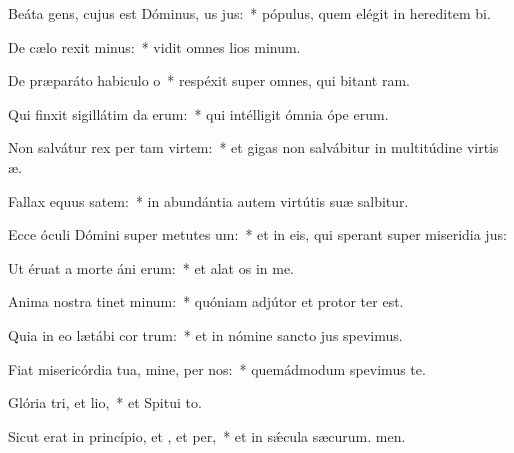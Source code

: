 \item Beáta gens, cujus est Dóminus, us jus:~* pópulus, quem elégit in hereditem bi.
\item De cælo rexit minus:~* vidit omnes lios minum.
\item De præparáto habiculo o~* respéxit super omnes, qui bitant ram.
\item Qui finxit sigillátim da erum:~* qui intélligit ómnia ópe erum.
\item Non salvátur rex per tam virtem:~* et gigas non salvábitur in multitúdine virtis æ.
\item Fallax equus  satem:~* in abundántia autem virtútis suæ  salbitur.
\item Ecce óculi Dómini super metutes um:~* et in eis, qui sperant super miseridia jus:
\item Ut éruat a morte áni erum:~* et alat os in me.
\item Anima nostra tinet minum:~* quóniam adjútor et protor ter est.
\item Quia in eo lætábi cor trum:~* et in nómine sancto jus spevimus.
\item Fiat misericórdia tua, mine, per nos:~* quemádmodum spevimus  te.
\item Glória tri, et lio,~* et Spitui to.
\item Sicut erat in princípio, et , et per,~* et in sǽcula sæcurum. men.
